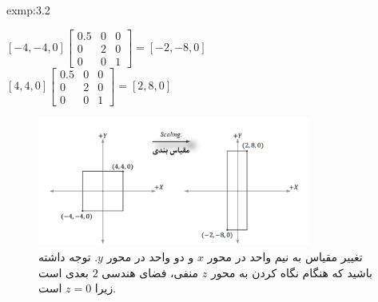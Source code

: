 {\begin{spacing}{1.5}
\begin{exmp}{exmp:3.2}
            \begin{center}
                $[-4,-4,0]\begin{bmatrix}
                              0.5 & 0 & 0 \\
                              0   & 2 & 0 \\
                              0   & 0 & 1
                \end{bmatrix}=[-2,-8,0]$\\$[4,4,0]\begin{bmatrix}
                                                      0.5 & 0 & 0 \\
                                                      0   & 2 & 0 \\
                                                      0   & 0 & 1
                \end{bmatrix}=[2,8,0]$
            \end{center}
            \begin{figure}[H]
                \centering
                \setlength{\belowcaptionskip}{-10pt}
                \includegraphics[width=0.8\textwidth]{Images/4/3/4.Session.1.3.2}
                \caption {تغییر مقیاس به نیم واحد در محور $x$ و دو واحد در محور $y$. توجه داشته باشید که هنگام نگاه کردن به محور $z$ منفی، فضای هندسی $2$ بعدی است زیرا $z=0$ است. \textbf{\vspace{12pt}}}
                \label{fig:4.Session.1.3.2}
            \end{figure}
        \end{exmp}
    \end{spacing}
}

